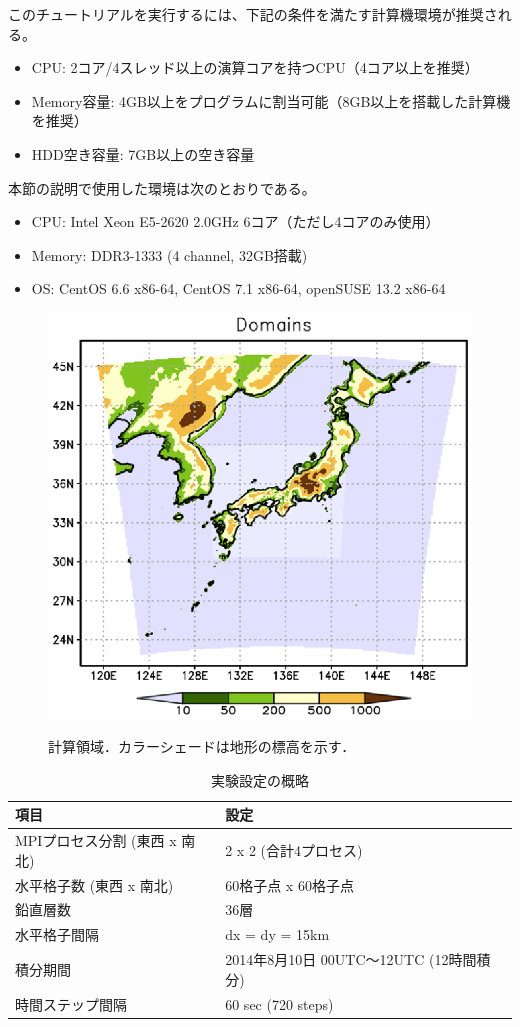 このチュートリアルを実行するには、下記の条件を満たす計算機環境が推奨される。
\begin{itemize}
\item CPU: 2コア/4スレッド以上の演算コアを持つCPU（4コア以上を推奨）
\item Memory容量: 4GB以上をプログラムに割当可能（8GB以上を搭載した計算機を推奨）
\item HDD空き容量: 7GB以上の空き容量
\end{itemize}
本節の説明で使用した環境は次のとおりである。
\begin{itemize}
\item CPU: Intel Xeon E5-2620 2.0GHz 6コア（ただし4コアのみ使用）
\item Memory: DDR3-1333 (4 channel, 32GB搭載)
\item OS: CentOS 6.6 x86-64, CentOS 7.1 x86-64, openSUSE 13.2 x86-64
\end{itemize}

\begin{figure}[tb]
\begin{center}
  \includegraphics[width=0.5\hsize]{./figure/real_domain.eps}\\
  \caption{計算領域．カラーシェードは地形の標高を示す．}
  \label{fig:tutrial_real_domain}
\end{center}
\end{figure}

\begin{table}[h]
\begin{center}
  \caption{実験設定の概略}
  \label{tab:grids}
  \begin{tabularx}{150mm}{|l|X|} \hline
    \rowcolor[gray]{0.9} 項目 & 設定 \\ \hline
    MPIプロセス分割 (東西 x 南北) & 2 x 2 (合計4プロセス) \\ \hline
    水平格子数 (東西 x 南北) & 60格子点 x 60格子点 \\ \hline
    鉛直層数                 & 36層                  \\ \hline
    水平格子間隔             & dx = dy = 15km       \\ \hline
    積分期間 & 2014年8月10日 00UTC～12UTC (12時間積分) \\ \hline
    時間ステップ間隔 & 60 sec (720 steps) \\ \hline
  \end{tabularx}
\end{center}
\end{table}


